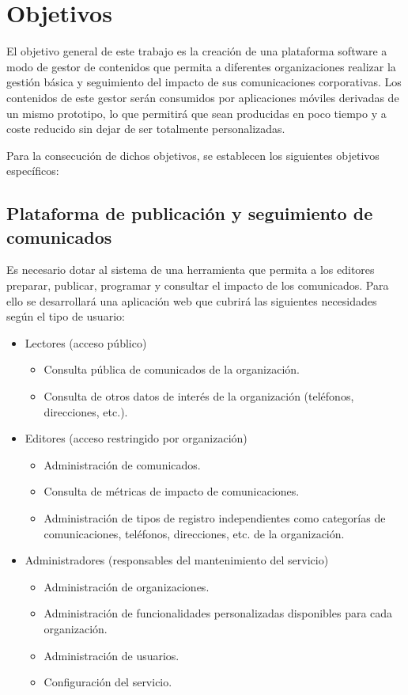 \chapter{Objetivos}

El objetivo general de este trabajo es la creación de una plataforma software a modo de gestor de contenidos que permita a diferentes organizaciones realizar la gestión básica y seguimiento del impacto de sus comunicaciones corporativas. Los contenidos de este gestor serán consumidos por aplicaciones móviles derivadas de un mismo prototipo, lo que permitirá que sean producidas en poco tiempo y a coste reducido sin dejar de ser totalmente personalizadas.

Para la consecución de dichos objetivos, se establecen los siguientes objetivos específicos:

\section{Plataforma de publicación y seguimiento de comunicados}\label{objetivos-especificos-gestor-contenidos}
Es necesario dotar al sistema de una herramienta que permita a los editores preparar, publicar, programar y  consultar el impacto de los comunicados. Para ello se desarrollará una aplicación web que cubrirá las siguientes necesidades según el tipo de usuario:
\begin{itemize}
    \item Lectores (acceso público)
    \begin{itemize}
        \item Consulta pública de comunicados de la organización.
        \item Consulta de otros datos de interés de la organización (teléfonos, direcciones, etc.).
    \end{itemize}
    \item Editores (acceso restringido por organización)
    \begin{itemize}
        \item Administración de comunicados.
        \item Consulta de métricas de impacto de comunicaciones.
        \item Administración de tipos de registro independientes como categorías de comunicaciones, teléfonos, direcciones, etc. de la organización.
    \end{itemize}
    \item Administradores (responsables del mantenimiento del servicio)
    \begin{itemize}
        \item Administración de organizaciones.
        \item Administración de funcionalidades personalizadas disponibles para cada organización.
        \item Administración de usuarios.
        \item Configuración del servicio.
    \end{itemize}
\end{itemize}

